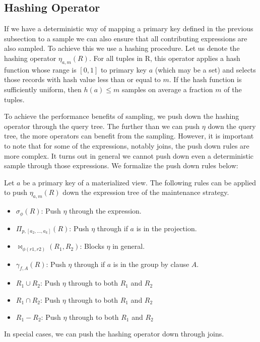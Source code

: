 \subsection{Hashing Operator}
\label{push}
If we have a deterministic way of mapping a primary key defined in the previous subsection to a sample we can also ensure that all contributing expressions are also sampled. 
To achieve this we use a hashing procedure.
Let us denote the hashing operator $\eta_{a, m}(R)$. 
For all tuples in R, this operator applies a hash function whose range is $[0,1]$ to primary key $a$ (which may be a set) and selects those records with hash value less than or equal to $m$.
If the hash function is sufficiently uniform, then $h(a) \le m$ samples on average a fraction $m$ of the tuples.

To achieve the performance benefits of sampling, we push down the hashing operator through the query tree.
The further than we can push $\eta$ down the query tree, the more operators can benefit from the sampling.
However, it is important to note that for some of the expressions, notably joins, the push down rules are more complex. 
It turns out in general we cannot push down even a deterministic sample through those expressions.
We formalize the push down rules below:
\begin{definition}
Let $a$ be a primary key of a materialized view. The following rules can be applied to push $\eta_{a, m}(R)$ down the expression tree of the maintenance strategy. 
\begin{itemize}[noitemsep]
\item $\sigma_{\phi}(R)$: Push $\eta$ through the expression.  
\item $\Pi_{p,[a_2,...,a_k]}(R)$: Push $\eta $ through if $a$ is in the projection.
\item $\bowtie_{\phi (r1,r2)}(R_1,R_2)$: Blocks $\eta $ in general. 
\item $\gamma_{f,A}(R)$: Push $\eta $ through if $a$ is in the group by clause $A$.
\item $R_1 \cup R_2$: Push $\eta $ through to both $R_1$ and $R_2$
\item $R_1 \cap R_2$: Push $\eta $ through to both $R_1$ and $R_2$
\item $R_1 - R_2$: Push $\eta $ through to both $R_1$ and $R_2$
\end{itemize}
\end{definition}
In special cases, we can push the hashing operator down through joins. 

